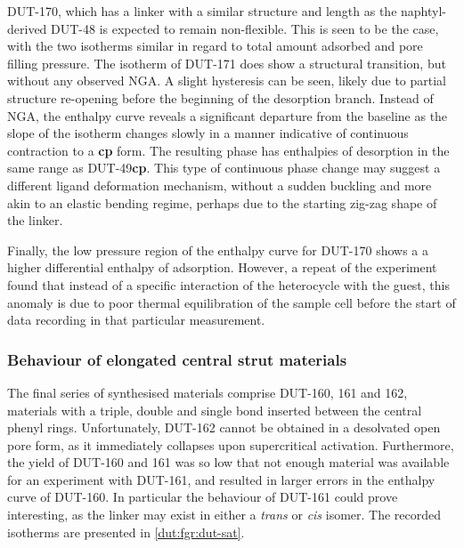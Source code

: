 DUT-170, which has a linker with a similar structure and length as
the naphtyl-derived DUT-48 is expected to remain non-flexible.
This is seen to be the case, with the two isotherms similar in 
regard to total amount adsorbed and pore filling pressure. 
The isotherm of DUT-171 does show a structural transition, 
but without any observed NGA. A slight hysteresis can be seen,
likely due to partial structure re-opening before the beginning 
of the desorption branch. Instead of NGA, the enthalpy curve 
reveals a significant departure from the baseline as the 
slope of the isotherm changes slowly in a manner indicative
of continuous contraction to a \textbf{cp} form. The resulting phase 
has enthalpies of desorption in the same range as DUT-49\textbf{cp}.
This type of continuous phase change may suggest a different 
ligand deformation mechanism, without a sudden buckling and 
more akin to an elastic bending regime, perhaps due to the 
starting zig-zag shape of the linker.

Finally, the low pressure region of the enthalpy curve for 
DUT-170 shows a a higher differential enthalpy of adsorption.
However, a repeat of the experiment found that instead of 
a specific interaction of the heterocycle with the guest,
this anomaly is due to poor thermal equilibration of the 
sample cell before the start of data recording in that 
particular measurement.

\subsubsection{Behaviour of elongated central strut materials}

The final series of synthesised materials comprise DUT-160, 
161 and 162, materials with a triple, double and single bond 
inserted between the central phenyl rings. Unfortunately, 
DUT-162 cannot be obtained in a desolvated open pore form, as it 
immediately collapses upon supercritical activation. Furthermore,
the yield of DUT-160 and 161 was so low that not enough 
material was available for an experiment with DUT-161, and resulted
in larger errors in the enthalpy curve of DUT-160. In particular 
the behaviour of DUT-161 could prove interesting, as the linker 
may exist in either a \textit{trans} or \textit{cis} isomer.
The recorded isotherms are presented in \autoref{dut:fgr:dut-sat}.

